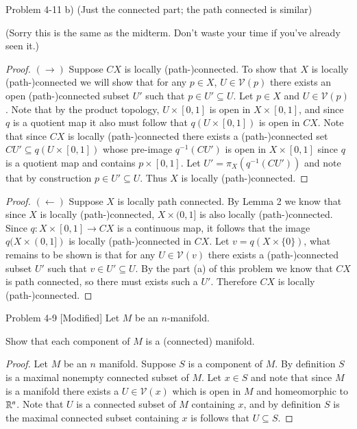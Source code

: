 \documentclass[minion]{homework651}
\begin{document}
\begin{problems}


\problem Problem 4-11 b) (Just the connected part; the path connected is similar) 

(Sorry this is the same as the midterm. Don't waste your time if you've already seen it.)
\begin{proof}$(\rightarrow)$ Suppose $CX$ is locally (path-)connected. To show that $X$ is locally (path-)connected we will show that for any $p \in X$, $U \in \mathcal{V}(p)$ there exists an open (path-)connected subset $U'$ such that $p \in U' \subseteq U$. Let $p \in X$ and $U \in \mathcal{V}(p)$. Note that by the product topology, $U \times [0, 1]$ is open in $X \times [0, 1]$, and since $q$ is a quotient map it also must follow that $q(U \times [0, 1])$ is open in $CX$. Note that since $CX$ is locally (path-)connected there exists a (path-)connected set $CU' \subseteq q(U \times [0, 1])$ whose pre-image $q^{-1}(CU')$ is open in $X \times [0, 1]$ since $q$ is a quotient map and contains $p \times [0, 1]$. Let $U' = \pi_X(q^{-1}(CU'))$ and note that by construction $p \in U' \subseteq U$. Thus $X$ is locally (path-)connected. 
        
\end{proof}
\begin{proof}$(\leftarrow)$ Suppose $X$ is locally path connected. By Lemma 2 we know that since $X$ is locally (path-)connected, $X \times (0, 1]$ is also locally (path-)connected. Since $q: X \times [0, 1] \to CX$ is a continuous map, it follows that the image $q(X \times (0, 1])$ is locally (path-)connected in $CX$. Let $v = q(X \times \{0\})$, what remains to be shown is that for any $U \in \mathcal{V}(v)$ there exists a (path-)connected subset $U'$ such that $v \in U' \subseteq U$. By the part (a) of this problem we know that $CX$ is path connected, so there must exists such a $U'$. Therefore $CX$ is locally (path-)connected.
\end{proof}


\problem Problem 4-9 [Modified]
Let $M$ be an $n$-manifold.
\begin{subproblems}
\item Show that each component of $M$ is a (connected) manifold.
\begin{proof} Let $M$ be an $n$ manifold. Suppose $S$ is a component of $M$. By definition 
    $S$ is a maximal nonempty connected subset of $M$. Let $x \in S$ and note that since $M$
    is a manifold there exists a $U \in \mathcal{V}(x)$ which is open in $M$ and homeomorphic 
    to $\mathbb R^n$. Note that $U$ is a connected subset of $M$ containing $x$, and by definition $S$
    is the maximal connected subset containing $x$ is follows that $U \subseteq S$.


\end{proof}
\end{subproblems}
\end{problems}
\end{document}
